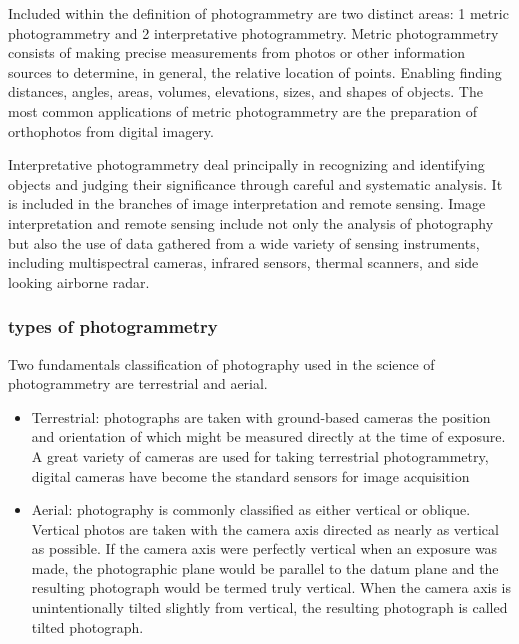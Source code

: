 Included within the definition of photogrammetry are two distinct areas: 1 metric photogrammetry and 2 interpretative photogrammetry. Metric photogrammetry consists of making precise measurements from photos or other information sources to determine, in general, the relative location of points. Enabling finding distances, angles, areas, volumes, elevations, sizes, and shapes of objects. The most common applications of metric photogrammetry are the preparation of orthophotos from digital imagery.

Interpretative photogrammetry deal principally in recognizing and identifying objects and judging their significance through careful and systematic analysis. It is included in the branches of image interpretation and remote sensing. Image interpretation and remote sensing include not only the analysis of photography but also the use of data gathered from a wide variety of sensing instruments, including multispectral cameras, infrared sensors, thermal scanners, and side looking airborne radar.\cite{elements_photogrammetry}
\subsubsection{types of photogrammetry}
Two fundamentals classification of photography used in the science of photogrammetry are terrestrial and aerial. 
\begin{itemize}
\item Terrestrial: photographs are taken with ground-based cameras the position and orientation of which might be measured directly at the time of exposure. A great variety of cameras are used for taking terrestrial photogrammetry, digital cameras have become the standard sensors for image acquisition 
\item Aerial: photography is commonly classified as either vertical or oblique. Vertical photos are taken with the camera axis directed as nearly as vertical as possible. If the camera axis were perfectly vertical when an exposure was made, the photographic plane would be parallel to the datum plane and the resulting photograph would be termed truly vertical. When the camera axis is unintentionally tilted slightly from vertical, the resulting photograph is called tilted photograph.\cite{elements_photogrammetry}
\end{itemize}
